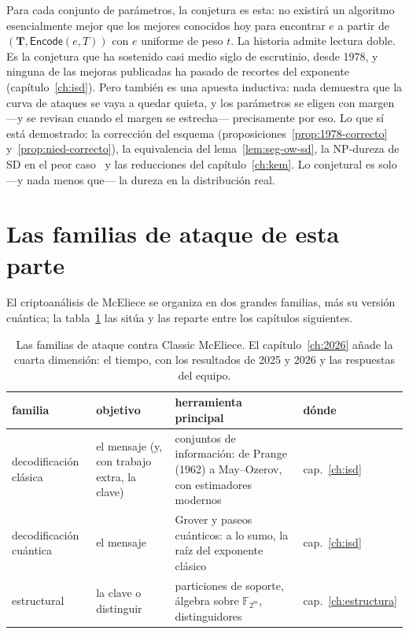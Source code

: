 \documentclass[11pt,a4paper,oneside]{report}
\newcommand{\GF}[1]{\mathbb{F}_{#1}}
\newcommand{\Tmat}{\mathbf{T}}          %
\begin{document}
\begin{rigor}
Para cada conjunto de parámetros, la conjetura es esta: no existirá
un algoritmo esencialmente mejor que los mejores conocidos hoy para
encontrar $e$ a partir de $(\Tmat,\textsf{Encode}(e,T))$ con $e$
uniforme de peso $t$. La historia admite lectura doble. Es la
conjetura que ha sostenido casi medio siglo de escrutinio, desde
1978, y ninguna de las mejoras publicadas ha pasado de recortes del
exponente (capítulo~\ref{ch:isd}). Pero también es una apuesta
inductiva: nada demuestra que la curva de ataques se vaya a quedar
quieta, y los parámetros se eligen con margen ---y se revisan cuando
el margen se estrecha--- precisamente por eso. Lo que sí está
demostrado: la corrección del esquema
(proposiciones~\ref{prop:1978-correcto} y~\ref{prop:nied-correcto}),
la equivalencia del lema~\ref{lem:seg-ow-sd}, la NP-dureza de SD en
el peor caso~\cite{bcmv1978} y las reducciones del
capítulo~\ref{ch:kem}. Lo conjetural es solo ---y nada menos que---
la dureza en la distribución real.
\end{rigor}

\section{Las familias de ataque de esta parte}

El criptoanálisis de McEliece se organiza en dos grandes familias,
más su versión cuántica; la tabla~\ref{tab:seg-familias} las sitúa y
las reparte entre los capítulos siguientes.

\begin{table}[htbp]
\centering
\small
\setlength{\tabcolsep}{6pt}
\begin{tabular}{@{}p{3.2cm}p{3.4cm}p{7.0cm}l@{}}
\toprule
familia & objetivo & herramienta principal & dónde\\
\midrule
decodificación clásica & el mensaje (y, con trabajo extra, la
clave) & conjuntos de información: de Prange (1962) a May--Ozerov,
con estimadores modernos & cap.~\ref{ch:isd}\\
decodificación cuántica & el mensaje & Grover y paseos cuánticos: a
lo sumo, la raíz del exponente clásico & cap.~\ref{ch:isd}\\
estructural & la clave o distinguir & particiones de soporte,
álgebra sobre $\GF{2^m}$, distinguidores & cap.~\ref{ch:estructura}\\
\bottomrule
\end{tabular}
\caption{Las familias de ataque contra Classic McEliece. El
capítulo~\ref{ch:2026} añade la cuarta dimensión: el tiempo, con los
resultados de 2025 y 2026 y las respuestas del equipo.}
\label{tab:seg-familias}
\end{table}
\end{document}
